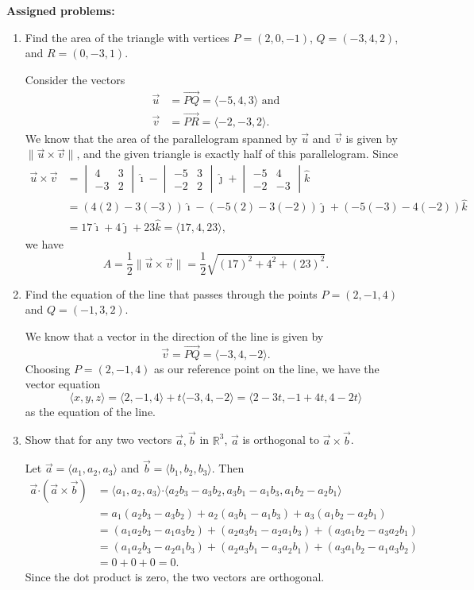 \documentclass[12pt]{article}
\newcommand{\len}[1]{\lVert #1\rVert}
\newcommand{\R}{\mathbb{R}}
\newcommand{\dotp}{\boldsymbol{\cdot}}
\newcommand{\bvm}{\begin{vmatrix}}
\newcommand{\evm}{\end{vmatrix}}
\begin{document}
\textbf{Assigned problems:}
\begin{enumerate}

  
 \item Find the area of the triangle with vertices $P=(2,0,-1)$, $Q=(-3,4,2)$, and $R=(0,-3,1)$.

\bigskip

Consider the vectors
\begin{align*}
 \vec{u} &= \overrightarrow{PQ}=\langle -5,4,3\rangle \text{ and}\\
 \vec{v} &= \overrightarrow{PR}=\langle -2,-3,2\rangle.
\end{align*}
We know that the area of the parallelogram spanned by $\vec{u}$ and $\vec{v}$ is given by $\len{\vec{u}\times\vec{v}}$, and the given triangle is exactly half of this parallelogram. Since
\begin{align*}
 \vec{u}\times\vec{v} &= \bvm 4&3\\-3&2\evm\hat{\imath}-\bvm -5&3\\-2&2\evm\hat{\jmath}+\bvm -5&4\\-2&-3\evm\hat{k}\\[3pt]
 & = (4(2)-3(-3))\hat{\imath}-(-5(2)-3(-2))\hat{\jmath}+(-5(-3)-4(-2))\hat{k}\\
 & = 17\hat{\imath}+4\hat{\jmath}+23\hat{k} = \langle 17,4,23\rangle,
\end{align*}
we have
\[
 A = \frac{1}{2}\len{\vec{u}\times\vec{v}}=\frac{1}{2}\sqrt{(17)^2+4^2+(23)^2}.
\]


\item Find the equation of the line that passes through the points $P=(2,-1,4)$ and $Q=(-1,3,2)$.

\bigskip

We know that a vector in the direction of the line is given by
\[
\vec{v}=\overrightarrow{PQ}=\langle -3,4,-2\rangle.
\]
Choosing $P=(2,-1,4)$ as our reference point on the line, we have the vector equation
\[
\langle x,y,z\rangle = \langle 2,-1,4\rangle+t\langle -3,4,-2\rangle = \langle 2-3t, -1+4t, 4-2t\rangle
\]
as the equation of the line.

 \item Show that for any two vectors $\vec{a},\vec{b}$ in $\R^3$, $\vec{a}$ is orthogonal to $\vec{a}\times\vec{b}$.
 
 \bigskip
 
 Let $\vec{a}=\langle a_1,a_2,a_3\rangle$ and $\vec{b} = \langle b_1,b_2,b_3\rangle$. Then
 \begin{align*}
 \vec{a}\dotp (\vec{a}\times\vec{b}) & = \langle a_1,a_2,a_3\rangle\dotp \langle a_2b_3-a_3b_2,a_3b_1-a_1b_3,a_1b_2-a_2b_1\rangle\\
 & = a_1(a_2b_3-a_3b_2)+a_2(a_3b_1-a_1b_3)+a_3(a_1b_2-a_2b_1)\\
 & = (a_1a_2b_3-a_1a_3b_2)+(a_2a_3b_1-a_2a_1b_3)+(a_3a_1b_2-a_3a_2b_1)\\
 & = (a_1a_2b_3-a_2a_1b_3)+(a_2a_3b_1-a_3a_2b_1)+(a_3a_1b_2-a_1a_3b_2)\\
 & = 0+0+0=0.
 \end{align*}
 Since the dot product is zero, the two vectors are orthogonal.


\end{enumerate}
\end{document}
